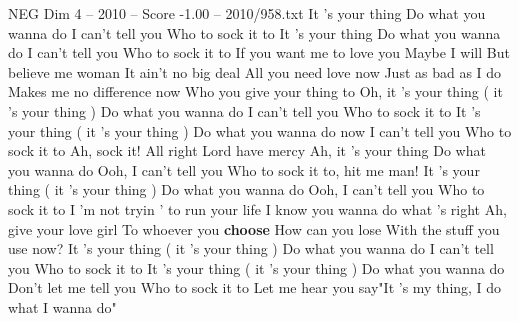 \begin{textsample}{NEG Dim 4 – 2010 – Score -1.00 – 2010/958.txt}  \label{ex:f4_neg_004}
It 's your thing Do what you wanna do I can't tell you Who to sock it to It 's your thing Do what you wanna do I can't tell you Who to sock it to If you want me to love you Maybe I will But believe me woman It ain't no big deal All you need love now Just as bad as I do Makes me no difference now Who you give your thing to Oh, it 's your thing ( it 's your thing ) Do what you wanna do I can't tell you Who to sock it to It 's your thing ( it 's your thing ) Do what you wanna do now I can't tell you Who to sock it to Ah, sock it!
All right Lord have mercy Ah, it 's your thing Do what you wanna do Ooh, I can't tell you Who to sock it to, hit me man!
It 's your thing ( it 's your thing ) Do what you wanna do Ooh, I can't tell you Who to sock it to I 'm not tryin ' to run your life I know you wanna do what 's right Ah, give your love girl To whoever you \textbf{choose} How can you lose With the stuff you use now?
It 's your thing ( it 's your thing ) Do what you wanna do I can't tell you Who to sock it to It 's your thing ( it 's your thing ) Do what you wanna do Don't let me tell you Who to sock it to Let me hear you say"It 's my thing, I do what I wanna do"

\end{textsample}
